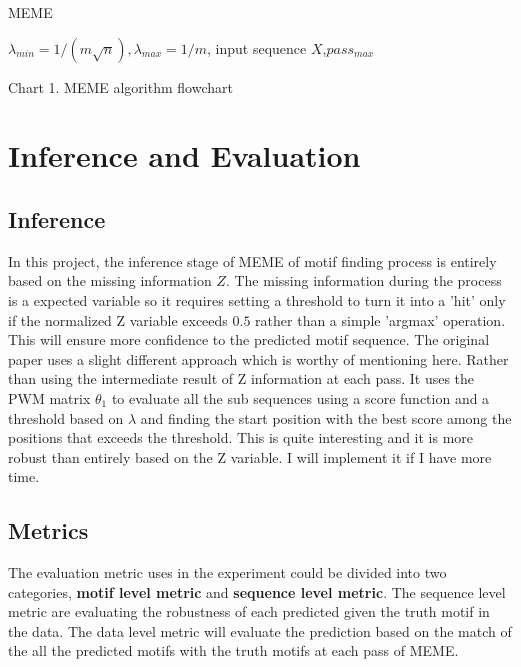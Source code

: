 \documentclass{article}
\begin{document}
\begin{algorithm}
\caption{MEME}
\REQUIRE $\lambda_{min}=1/(m\sqrt{n}), \lambda_{max}=1/m$, input sequence $X$,$pass_{max}$
\EndFor
{} 
        \EndFor
    \EndFor
\EndFor
\State {}
\end{algorithm}
\quad\quad\quad\quad\quad\quad\quad\quad\quad\quad Chart 1. MEME algorithm flowchart
\section{Inference and Evaluation}
\subsection{Inference}
In this project, the inference stage of MEME of motif finding process is entirely based on the missing information $Z$. The missing information during the process is a expected variable so it requires setting a threshold to turn it into a 'hit' only if the normalized Z variable exceeds $0.5$ rather than a simple 'argmax' operation. This will ensure more confidence to the predicted motif sequence. 
The original paper uses a slight different approach which is worthy of mentioning here. Rather than using the intermediate result of Z information at each pass. It uses the PWM matrix $\theta_1$ to evaluate all the sub sequences using a score function and a threshold based on $\lambda$ and finding the start position with the best score among the positions that exceeds the threshold. This is quite interesting and it is more robust than entirely based on the Z variable. I will implement it if I have more time.
\subsection{Metrics}
The evaluation metric uses in the experiment could be divided into two categories, \textbf{motif level metric} and \textbf{sequence level metric}. The sequence level metric are evaluating the robustness of each predicted given the truth motif in the data. The data level metric will evaluate the prediction based on the match of the all the predicted motifs with the truth motifs at each pass of MEME. 
\end{document}
